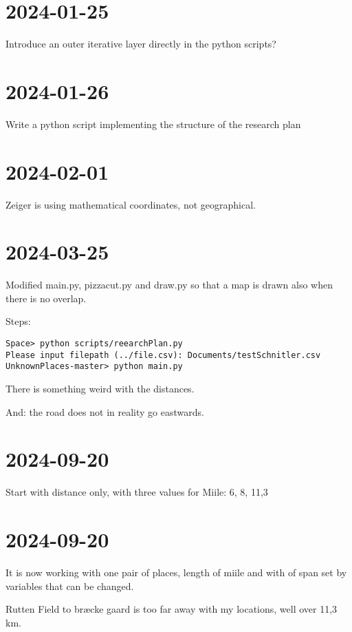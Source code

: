 \documentclass[12pt]{book}
\begin{document}
\section{2024-01-25}

Introduce an outer iterative layer directly in the python scripts?

\section{2024-01-26}

Write a python script implementing the structure of the research plan

\section{2024-02-01}

Zeiger is using mathematical coordinates, not geographical.

\section{2024-03-25}

Modified main.py, pizzacut.py and draw.py so that a map is drawn also when there is no overlap. 

Steps:

\begin{lstlisting}
Space> python scripts/reearchPlan.py
Please input filepath (../file.csv): Documents/testSchnitler.csv
UnknownPlaces-master> python main.py
\end{lstlisting}

There is something weird with the distances.

And: the road does not in reality go eastwards.

\section{2024-09-20}

Start with distance only, with three values for Miile: 6, 8, 11,3

\section{2024-09-20}

It is now working with one pair of places, length of miile and with of span set by variables that can be changed. 

Rutten Field to bræcke gaard is too far away with my locations, well over 11,3 km.
\end{document}
